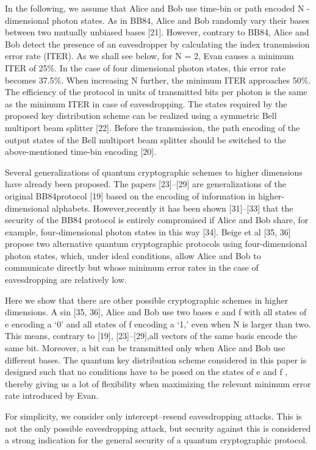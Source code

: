 In the following, we assume that Alice and Bob use time-bin or path encoded N -dimensional photon states. As in BB84, Alice and Bob randomly vary their bases between two mutually unbiased bases [21]. However, contrary to BB84, Alice and Bob detect the presence of an eavesdropper by calculating the index transmission error rate (ITER). As we shall see below, for N = 2, Evan causes a minimum ITER of 25\%. In the case of four dimensional photon states, this error rate becomes 37.5\%. When increasing N further, the minimum ITER approaches 50\%. The efficiency of the protocol in units of transmitted bits per photon is the same as the minimum ITER in case of eavesdropping. The states required by the proposed key distribution scheme can be realized using a symmetric Bell multiport beam splitter [22]. Before the transmission, the path encoding of the output states of the Bell multiport beam splitter should be switched to the above-mentioned time-bin encoding [20].

Several generalizations of quantum cryptographic schemes to higher dimensions have already been proposed. The papers [23]–[29] are generalizations of the original BB84protocol [19] based on the encoding of information in higher-dimensional alphabets. However,recently it has been shown [31]–[33] that the security of the BB84 protocol is entirely compromised if Alice and Bob share, for example, four-dimensional photon states in this way [34]. Beige et al [35, 36] propose two alternative quantum cryptographic protocols using four-dimensional photon states, which, under ideal conditions, allow Alice and Bob to communicate directly but whose minimum error rates in the case of eavesdropping are relatively low.

Here we show that there are other possible cryptographic schemes in higher dimensions. A sin [35, 36], Alice and Bob use two bases e and f with all states of e encoding a ‘0’ and all states of f encoding a ‘1,’ even when N is larger than two. This means, contrary to [19], [23]–[29],all vectors of the same basis encode the same bit. Moreover, a bit can be transmitted only when Alice and Bob use different bases. The quantum key distribution scheme considered in this paper is designed such that no conditions have to be posed on the states of e and f , thereby giving us a lot of flexibility when maximizing the relevant minimum error rate introduced by Evan.

For simplicity, we consider only intercept–resend eavesdropping attacks. This is not the only possible eavesdropping attack, but security against this is considered a strong indication for the general security of a quantum cryptographic protocol.

